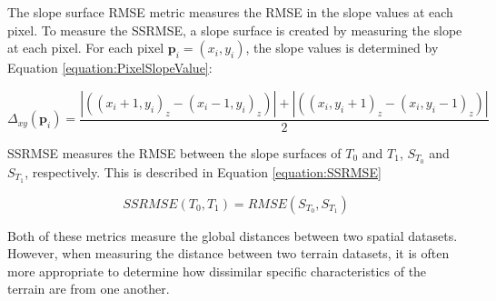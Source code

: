 % 
% 

The slope surface RMSE metric measures the RMSE in the slope values at each pixel. To measure the SSRMSE, a slope surface is created by measuring the slope at each pixel. For each pixel $\textbf{p}_{i} = \left(x_{i}, y_{i}\right)$, the slope values is determined by Equation \ref{equation:PixelSlopeValue}:

\begin{equation}
\label{equation:PixelSlopeValue}
  \Delta_{xy} \left( \textbf{p}_{i} \right) = \dfrac{ |\left( \left( x_{i} + 1, y_{i}\right)_{z} - \left(x_{i} - 1, y_{i} \right)_{z} \right)| + |\left( \left( x_{i}, y_{i} + 1\right)_{z} - \left(x_{i}, y_{i} - 1 \right)_{z} \right)| }{2}
\end{equation}

SSRMSE measures the RMSE between the slope surfaces of $T_{0}$ and $T_{1}$, $S_{T_{0}}$ and $S_{T_{1}}$, respectively. This is described in Equation \ref{equation:SSRMSE}

\begin{equation}
\label{equation:SSRMSE}
  SSRMSE\left(T_{0}, T_{1}\right) = RMSE\left(S_{T_{0}}, S_{T_{1}}\right)
\end{equation}

Both of these metrics measure the global distances between two spatial datasets. However, when measuring the distance between two terrain datasets, it is often more appropriate to determine how dissimilar specific characteristics of the terrain are from one another.



